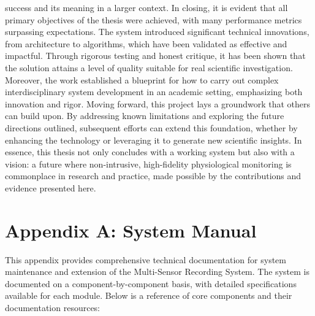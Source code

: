 \documentclass[11pt,a4paper]{report}
\begin{document}
{success and its meaning in a larger context. In closing, it is evident that all primary objectives of the thesis were achieved, with many performance metrics surpassing expectations. The system introduced significant technical innovations, from architecture to algorithms, which have been validated as effective and impactful. Through rigorous testing and honest critique, it has been shown that the solution attains a level of quality suitable for real scientific investigation. Moreover, the work established a blueprint for how to carry out complex interdisciplinary system development in an academic setting, emphasizing both innovation and rigor. Moving forward, this project lays a groundwork that others can build upon. By addressing known limitations and exploring the future directions outlined, subsequent efforts can extend this foundation, whether by enhancing the technology or leveraging it to generate new scientific insights. In essence, this thesis not only concludes with a working system but also with a vision: a future where non-intrusive, high-fidelity physiological monitoring is commonplace in research and practice, made possible by the contributions and evidence presented here.

\appendix
\chapter*{Appendix A: System Manual}

This appendix provides comprehensive technical documentation for system maintenance and extension of the Multi-Sensor Recording System. The system is documented on a component-by-component basis, with detailed specifications available for each module. Below is a reference of core components and their documentation resources:

}
\end{document}
